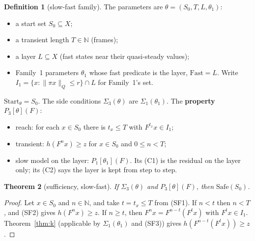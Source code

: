 \documentclass[11pt]{article}
\newtheorem{theorem}{Theorem}
\theoremstyle{definition}
\newtheorem{definition}[theorem]{Definition}
\newcommand{\N}{\mathbb{N}}
\newcommand{\Fast}{\ensuremath{\mathrm{Fast}}}
\newcommand{\Start}{\ensuremath{\mathrm{Start}}}
\newcommand{\nQ}[1]{\|#1\|_Q}
\begin{document}
\begin{definition}[slow-fast family]\label{def:sf}
The parameters are $\theta = (S_0, T, L, \theta_1)$:
\begin{itemize}
\item a start set $S_0 \subseteq X$;
\item a transient length $T \in \N$ (frames);
\item a layer $L \subseteq X$ (fast states near their quasi-steady values);
\item Family~1 parameters $\theta_1$ whose fast predicate is the layer, $\Fast = L$. Write $I_1 = \{x : \nQ{\pi x} \le r\} \cap L$ for Family~1's set.
\end{itemize}
$\Start_\theta = S_0$. The side conditions $\Sigma_3(\theta)$ are $\Sigma_1(\theta_1)$. The \textbf{property} $P_3[\theta](F)$:
\begin{itemize}
\item[(SF1)] reach: for each $x \in S_0$ there is $t_x \le T$ with $F^{t_x} x \in I_1$;
\item[(SF2)] transient: $h(F^n x) \ge z$ for $x \in S_0$ and $0 \le n < T$;
\item[(SF3)] slow model on the layer: $P_1[\theta_1](F)$. Its (C1) is the residual on the layer only; its (C2) says the layer is kept from step to step.
\end{itemize}
\end{definition}

\begin{theorem}[sufficiency, slow-fast]\label{thm:sf}
If $\Sigma_3(\theta)$ and $P_3[\theta](F)$, then $\mathrm{Safe}(S_0)$.
\end{theorem}
\begin{proof}
Let $x \in S_0$ and $n \in \N$, and take $t = t_x \le T$ from (SF1). If $n < t$ then $n < T$, and (SF2) gives $h(F^n x) \ge z$. If $n \ge t$, then $F^n x = F^{n-t}(F^t x)$ with $F^t x \in I_1$. Theorem~\ref{thm:k} (applicable by $\Sigma_1(\theta_1)$ and (SF3)) gives $h(F^{n-t}(F^t x)) \ge z$.
\end{proof}
\end{document}
